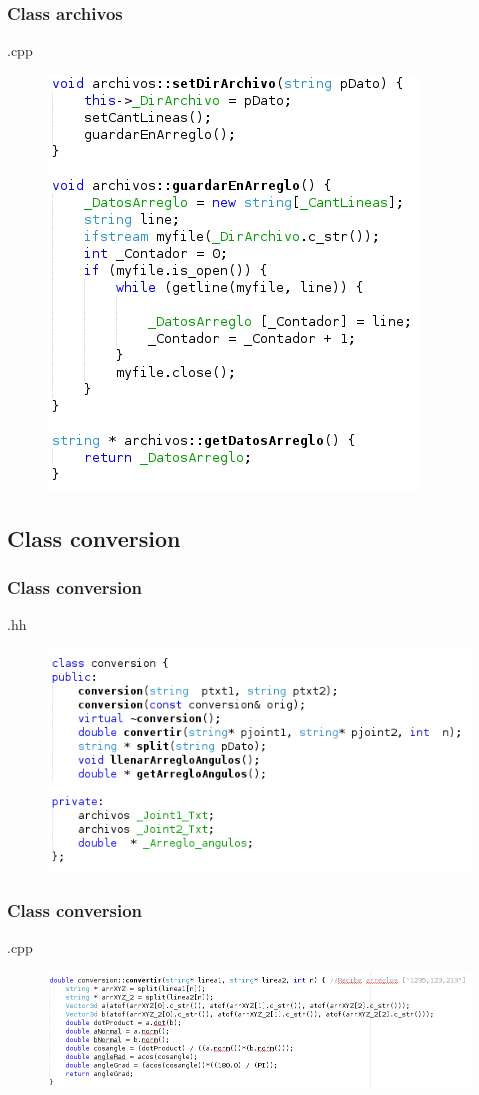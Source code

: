 \documentclass{beamer}
\begin{document}
\begin{frame}
\frametitle{Class archivos}
.cpp

\begin{figure}
\includegraphics[width=0.5\linewidth]{15.png}
\end{figure}


\end{frame}




\subsection{Class conversion}

\begin{frame}
\frametitle{Class conversion}
.hh

\begin{figure}
\includegraphics[width=0.6\linewidth]{16.png}
\end{figure}


\end{frame}



\begin{frame}
\frametitle{Class conversion}
.cpp

\begin{figure}
\includegraphics[width=1\linewidth]{17.png}
\end{figure}


\end{frame}
\end{document}
